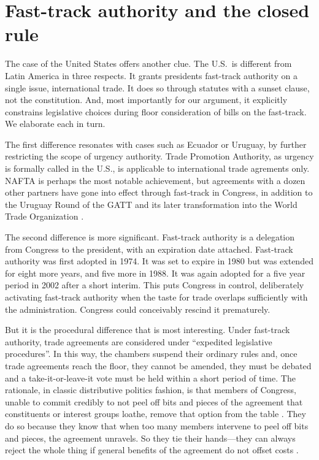 \documentclass[letter,12pt]{article}
\begin{document}
\section{Fast-track authority and the closed rule}

The case of the United States offers another clue. The U.S.\ is different from Latin America in three respects. It grants presidents fast-track authority on a single issue, international trade. It does so through statutes with a sunset clause, not the constitution. And, most importantly for our argument, it explicitly constrains legislative choices during floor consideration of bills on the fast-track. We elaborate each in turn.

The first difference resonates with cases such as Ecuador or Uruguay, by further restricting the scope of urgency authority. Trade Promotion Authority, as urgency is formally called in the U.S., is applicable to international trade agrements only. NAFTA is perhaps the most notable achievement, but agreements with a dozen other partners have gone into effect through fast-track in Congress, in addition to the Uruguay Round of the GATT and its later transformation into the World Trade Organization \citep{crs-2015-tpa}. 

The second difference is more significant. Fast-track authority is a delegation from Congress to the president, with an expiration date attached. Fast-track authority was first adopted in 1974. It was set to expire in 1980 but was extended for eight more years, and five more in 1988. It was again adopted for a five year period in 2002 after a short interim. This puts Congress in control, deliberately activating fast-track authority when the taste for trade overlaps sufficiently with the administration. Congress could conceivably rescind it prematurely.

But it is the procedural difference that is most interesting. Under fast-track authority, trade agreements are considered under ``expedited legislative procedures''. In this way, the chambers suspend their ordinary rules and, once trade agreements reach the floor, they cannot be amended, they must be debated and a take-it-or-leave-it vote must be held within a short period of time. The rationale, in classic distributive politics fashion, is that members of Congress, unable to commit credibly to not peel off bits and pieces of the agreement that constituents or interest groups loathe, remove that option from the table \citep{mcnollgast.1987}. They do so because they know that when too many members intervene to peel off bits and pieces, the agreement unravels. So they tie their hands---they can always reject the whole thing if general benefits of the agreement do not offset costs \citep{destler-1992,destler-1991,margolis-1986,haggard-1988,goldstein-1988,lohmann-ohalloran.1994}.
\end{document}
